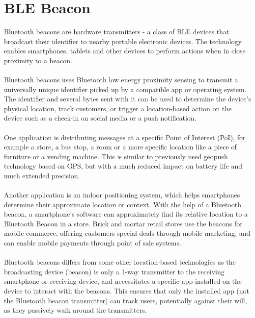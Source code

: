 \documentclass[a4paper,12pt]{report}
\begin{document}
\section{BLE Beacon}
\paragraph{}Bluetooth beacons are hardware transmitters - a class of BLE devices that broadcast their identifier to nearby portable electronic devices. The technology enables smartphones, tablets and other devices to perform actions when in close proximity to a beacon. 
\paragraph{}Bluetooth beacons uses Bluetooth low energy proximity sensing to transmit a universally unique identifier picked up by a compatible app or operating system. The identifier and several bytes sent with it can be used to determine the device's physical location, track customers, or trigger a location-based action on the device such as a check-in on social media or a push notification.
\paragraph{}One application is distributing messages at a specific Point of Interest (PoI), for example a store, a bus stop, a room or a more specific location like a piece of furniture or a vending machine. This is similar to previously used geopush technology based on GPS, but with a much reduced impact on battery life and much extended precision.
\paragraph{}Another application is an indoor positioning system, which helps smartphones determine their approximate location or context. With the help of a Bluetooth beacon, a smartphone's software can approximately find its relative location to a Bluetooth Beacon in a store. Brick and mortar retail stores use the beacons for mobile commerce, offering customers special deals through mobile marketing, and can enable mobile payments through point of sale systems.
\paragraph{}Bluetooth beacons differs from some other location-based technologies as the broadcasting device (beacon) is only a 1-way transmitter to the receiving smartphone or receiving device, and necessitates a specific app installed on the device to interact with the beacons. This ensures that only the installed app (not the Bluetooth beacon transmitter) can track users, potentially against their will, as they passively walk around the transmitters.
\end{document}
